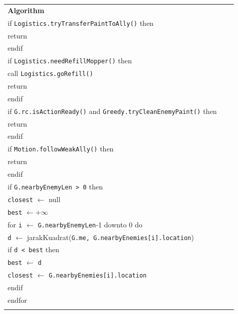 \documentclass{article}
\newenvironment{pseudobox}
{
\centering
\begin{longtable}{|p{0.94\linewidth}|}
\hline
}
{
\\ \hline
\end{longtable}
\vspace{0.05cm}
}
\begin{document}
\begin{enumerate}[label=\alph*.]
\begin{enumerate}[label=\alph*.]
\begin{pseudobox}
\textbf{Algorithm} \\
\hspace*{1.5em}if \texttt{Logistics.tryTransferPaintToAlly()} then \\
\hspace*{3em}return \\
\hspace*{1.5em}endif \\

\hspace*{1.5em}if \texttt{Logistics.needRefillMopper()} then \\
\hspace*{3em}call \texttt{Logistics.goRefill()} \\
\hspace*{3em}return \\
\hspace*{1.5em}endif \\

\hspace*{1.5em}if \texttt{G.rc.isActionReady()} and \texttt{Greedy.tryCleanEnemyPaint()} then \\
\hspace*{3em}return \\
\hspace*{1.5em}endif \\

\hspace*{1.5em}if \texttt{Motion.followWeakAlly()} then \\
\hspace*{3em}return \\
\hspace*{1.5em}endif \\

\hspace*{1.5em}if \texttt{G.nearbyEnemyLen > 0} then \\
\hspace*{3em}\texttt{closest} $\leftarrow$ null \\
\hspace*{3em}\texttt{best} $\leftarrow +\infty$ \\

\hspace*{3em}for \texttt{i} $\leftarrow$ \texttt{G.nearbyEnemyLen}-1 downto 0 do \\
\hspace*{4.5em}\texttt{d} $\leftarrow$ jarakKuadrat(\texttt{G.me, G.nearbyEnemies[i].location}) \\
\hspace*{4.5em}if \texttt{d < best} then \\
\hspace*{6em}\texttt{best} $\leftarrow$ \texttt{d} \\
\hspace*{6em}\texttt{closest} $\leftarrow$ \texttt{G.nearbyEnemies[i].location} \\
\hspace*{4.5em}endif \\
\hspace*{3em}endfor \\


\end{pseudobox}
\end{enumerate}
\end{enumerate}
\end{document}
